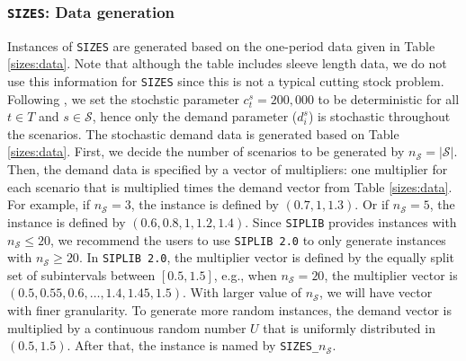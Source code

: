 \subsubsection{\texttt{SIZES}: Data generation}
Instances of \texttt{SIZES} are generated based on the one-period data given in Table \ref{sizes:data}. Note that although the table includes sleeve length data, we do not use this information for \texttt{SIZES} since this is not a typical cutting stock problem. Following \cite{journal:JSW1999}, we set the stochstic parameter $c_t^s=200,000$ to be deterministic for all $t\in T$ and $s\in\mathcal{S}$, hence only the demand parameter ($d_i^s$) is stochastic throughout the scenarios. The stochastic demand data is generated based on Table \ref{sizes:data}. First, we decide the number of scenarios to be generated by $n_\mathcal{S}=|\mathcal{S}|$. Then, the demand data is specified by a vector of multipliers: one multiplier for each scenario that is multiplied times the demand vector from Table \ref{sizes:data}. For example, if $n_\mathcal{S}=3$, the instance is defined by $(0.7,1,1.3)$. Or if $n_\mathcal{S}=5$, the instance is defined by $(0.6,0.8,1,1.2,1.4)$. Since \texttt{SIPLIB} provides instances with $n_\mathcal{S}\le 20$, we recommend the users to use \texttt{SIPLIB 2.0} to only generate instances with $n_\mathcal{S} \ge 20$. In \texttt{SIPLIB 2.0}, the multiplier vector is defined by the equally split set of subintervals between $[0.5,1.5]$, e.g., when $n_\mathcal{S}=20$, the multiplier vector is $(0.5,0.55,0.6,\ldots,1.4,1.45,1.5)$. With larger value of $n_\mathcal{S}$, we will have vector with finer granularity. To generate more random instances, the demand vector is multiplied by a continuous random number $U$ that is uniformly distributed in $(0.5,1.5)$. After that, the instance is named by \texttt{SIZES\_$n_\mathcal{S}$}.

